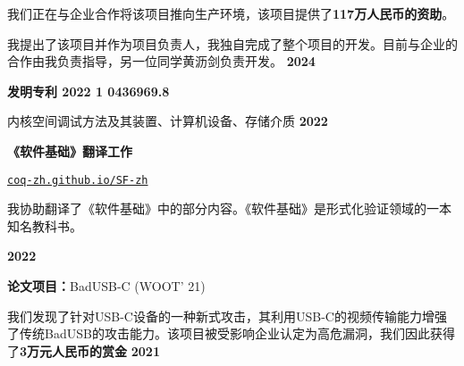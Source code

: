 \documentclass{resume}
\begin{document}
\begin{content}
	{我们正在与企业合作将该项目推向生产环境，该项目提供了\textbf{117万人民币的资助}。}

	{我提出了该项目并作为项目负责人，我独自完成了整个项目的开发。目前与企业的合作由我负责指导，另一位同学黄沥剑负责开发。}
	\hfill {\bf 2024}

	\textbf{发明专利 2022 1 0436969.8}

	{内核空间调试方法及其装置、计算机设备、存储介质}
	\hfill {\bf 2022}

	\textbf{《软件基础》翻译工作} \enspace
	{\href{https://coq-zh.github.io/SF-zh/}{\texttt{coq-zh.github.io/SF-zh}}

		{我协助翻译了《软件基础》中的部分内容。《软件基础》是形式化验证领域的一本知名教科书。}}
	\hfill {\bf 2022}

	\textbf{论文项目：}BadUSB-C (WOOT' 21)

	{我们发现了针对USB-C设备的一种新式攻击，其利用USB-C的视频传输能力增强了传统BadUSB的攻击能力。该项目被受影响企业认定为高危漏洞，我们因此获得了\textbf{3万元人民币的赏金}}
	\hfill {\bf 2021}


	\sectionlineskip
\end{content}
\end{document}
